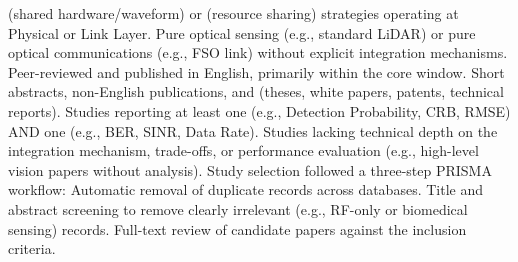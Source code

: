 {}\markdownRendererPipe{}  \markdownRendererPipe{}  (shared hardware/waveform) or  (resource sharing) strategies operating at Physical or Link Layer. \markdownRendererPipe{}  Pure optical sensing (e.g., standard LiDAR) or pure optical communications (e.g., FSO link) without explicit integration mechanisms. \markdownRendererPipe{}\markdownRendererSoftLineBreak
{}\markdownRendererPipe{}  \markdownRendererPipe{} Peer-reviewed  and  published in English, primarily within the  core window. \markdownRendererPipe{} Short abstracts, non-English publications, and  (theses, white papers, patents, technical reports). \markdownRendererPipe{}\markdownRendererSoftLineBreak
{}\markdownRendererPipe{}  \markdownRendererPipe{} Studies reporting at least one  (e.g., Detection Probability, CRB, RMSE) AND one  (e.g., BER, SINR, Data Rate). \markdownRendererPipe{} Studies lacking technical depth on the integration mechanism, trade-offs, or performance evaluation (e.g., high-level vision papers without analysis). \markdownRendererPipe{}\markdownRendererParagraphSeparator
{}
\markdownRendererSectionEnd 
\markdownRendererSectionEnd \markdownRendererSectionBegin
{}\markdownRendererInterblockSeparator
{}Study selection followed a three-step PRISMA workflow:\markdownRendererInterblockSeparator
{}\markdownRendererOlBeginTight
{} Automatic removal of duplicate records across databases.\markdownRendererOlItemEnd 
{} Title and abstract screening to remove clearly irrelevant (e.g., RF-only or biomedical sensing) records.\markdownRendererOlItemEnd 
{} Full-text review of candidate papers against the inclusion criteria.\markdownRendererOlItemEnd 
\markdownRendererOlEndTight \markdownRendererInterblockSeparator
